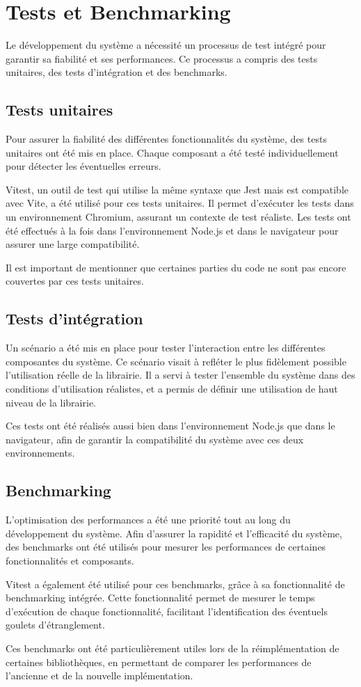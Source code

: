 \section{Tests et Benchmarking}

Le développement du système a nécessité un processus de test intégré pour garantir sa fiabilité et ses performances. Ce processus a compris des tests unitaires, des tests d'intégration et des benchmarks.

\subsection{Tests unitaires}

Pour assurer la fiabilité des différentes fonctionnalités du système, des tests unitaires ont été mis en place. Chaque composant a été testé individuellement pour détecter les éventuelles erreurs.

Vitest, un outil de test qui utilise la même syntaxe que Jest mais est compatible avec Vite, a été utilisé pour ces tests unitaires. Il permet d'exécuter les tests dans un environnement Chromium, assurant un contexte de test réaliste. Les tests ont été effectués à la fois dans l'environnement Node.js et dans le navigateur pour assurer une large compatibilité.

Il est important de mentionner que certaines parties du code ne sont pas encore couvertes par ces tests unitaires.

\subsection{Tests d'intégration}

Un scénario a été mis en place pour tester l'interaction entre les différentes composantes du système. Ce scénario visait à refléter le plus fidèlement possible l'utilisation réelle de la librairie. Il a servi à tester l'ensemble du système dans des conditions d'utilisation réalistes, et a permis de définir une utilisation de haut niveau de la librairie.

Ces tests ont été réalisés aussi bien dans l'environnement Node.js que dans le navigateur, afin de garantir la compatibilité du système avec ces deux environnements.

\subsection{Benchmarking}

L'optimisation des performances a été une priorité tout au long du développement du système. Afin d'assurer la rapidité et l'efficacité du système, des benchmarks ont été utilisés pour mesurer les performances de certaines fonctionnalités et composants.

Vitest a également été utilisé pour ces benchmarks, grâce à sa fonctionnalité de benchmarking intégrée. Cette fonctionnalité permet de mesurer le temps d'exécution de chaque fonctionnalité, facilitant l'identification des éventuels goulets d'étranglement.

Ces benchmarks ont été particulièrement utiles lors de la réimplémentation de certaines bibliothèques, en permettant de comparer les performances de l'ancienne et de la nouvelle implémentation.